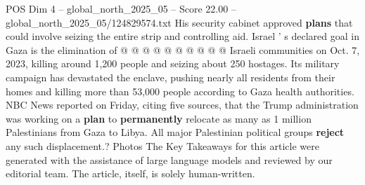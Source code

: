 \begin{textsample}{POS Dim 4 – global\_north\_2025\_05 – Score 22.00 – global\_north\_2025\_05/124829574.txt}
His security cabinet approved \textbf{plans} that could involve seizing the entire strip and controlling aid.
Israel ' s declared goal in Gaza is the elimination of @ @ @ @ @ @ @ @ @ @ Israeli communities on Oct. 7, 2023, killing around 1,200 people and seizing about 250 hostages.
Its military campaign has devastated the enclave, pushing nearly all residents from their homes and killing more than 53,000 people according to Gaza health authorities.
NBC News reported on Friday, citing five sources, that the Trump administration was working on a \textbf{plan} to \textbf{permanently} relocate as many as 1 million Palestinians from Gaza to Libya.
All major Palestinian political groups \textbf{reject} any such displacement.?
Photos The Key Takeaways for this article were generated with the assistance of large language models and reviewed by our editorial team.
The article, itself, is solely human-written.

\end{textsample}
